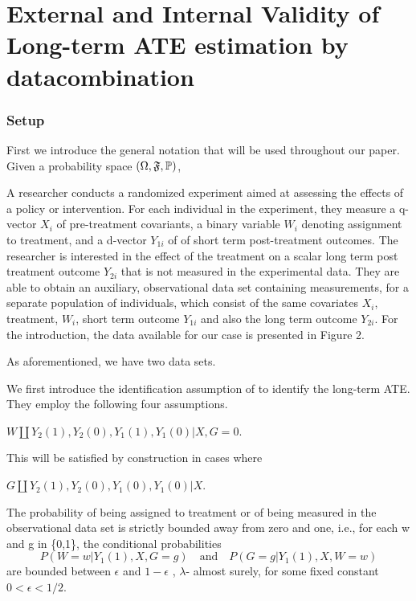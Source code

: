 \documentclass{article}
\begin{document}
\part{External and Internal Validity of Long-term ATE estimation by datacombination}
\section{Setup}

First we introduce the general notation that will be used throughout our paper.
Given a probability space $(\Omega,\mathfrak{F},\mathbb{P})$, \todo

A researcher conducts a randomized experiment aimed at assessing the effects of a policy or intervention. For each individual in the experiment, they measure a q-vector $X_i$ of pre-treatment covariants, a binary variable $W_i$ denoting assignment to treatment, and a d-vector $Y_{1i}$ of of short term post-treatment outcomes. The researcher is interested in the effect of the treatment on a scalar long term post treatment outcome $Y_{2i} $ that is not measured in the experimental data. They are able to obtain an auxiliary, observational data set containing measurements, for a separate population of individuals, which consist of the same covariates $X_i $, treatment, $W_i$, short term outcome $Y_{1i} $ and also the long term outcome $Y_{2i}$. 
For the introduction, the data available for our case is presented in Figure 2. 


As aforementioned, we have two data sets. 

We first introduce the identification assumption of \cite{athey2020combining} to identify the long-term ATE. They employ the following four assumptions.
\cite{athey2020combining} 
\begin{assumption}\label{ass: exp1}
    $W \amalg Y_2(1), Y_2(0), Y_1(1), Y_1(0) | X, G=0$.
\end{assumption}

This will be satisfied by construction in cases where 

\begin{assumption}\label{ass: ex1}
    $G \amalg Y_2(1), Y_2(0), Y_1(0), Y_1(0) | X$.
\end{assumption}

\begin{assumption}
    The probability of being assigned to treatment or of being measured in the observational data set is strictly bounded away from zero and one, i.e., for each w and g in \{0,1\}, the conditional probabilities 
    \begin{equation}
        P(W = w | Y_1(1), X, G = g ) \quad\text{and}\quad P(G=g | Y_1(1), X, W = w) 
    \end{equation}
    are bounded between $\epsilon $ and $ 1 - \epsilon $ , $ \lambda$- almost surely, for some fixed constant $ 0 < \epsilon < 1/2 $.
\end{assumption}
\end{document}
